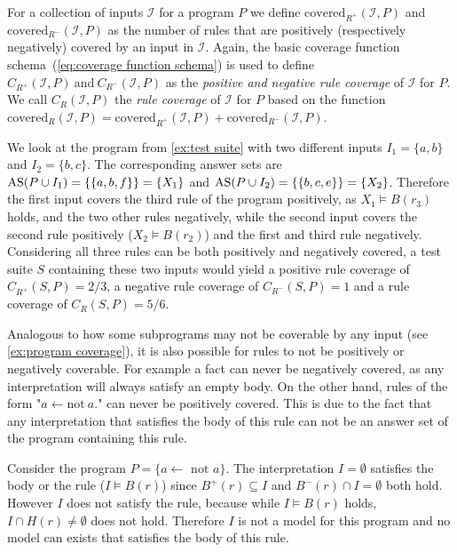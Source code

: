 For a collection of inputs $\mathcal{I}$ for a program $P$ we define \(\text{covered}_{R^+}(\mathcal{I}, P)\) and \linebreak \(\text{covered}_{R^-}(\mathcal{I}, P)\) as the number of rules that are positively (respectively negatively) covered by an input in $\mathcal{I}$. Again, the basic coverage function schema~(\ref{eq:coverage function schema}) is used to define \(C_{R^+}(\mathcal{I}, P)\ \text{and}\ C_{R^-}(\mathcal{I}, P)\) as the \emph{positive and negative rule coverage} of $\mathcal{I}$ for $P$. We call \(C_R(\mathcal{I}, P)\) the \emph{rule coverage} of $\mathcal{I}$ for $P$ based on the function \(\text{covered}_{R}(\mathcal{I}, P) = \text{covered}_{R^+}(\mathcal{I}, P) + \text{covered}_{R^-}(\mathcal{I}, P)\).

\begin{example}
\label{ex:rule coverage}
    We look at the program from \cref{ex:test suite} with two different inputs \(I_1 = \{a, b\}\) and \(I_2 = \{b, c\}\). The corresponding answer sets are \(\operatorname{AS}(P \cup I_1) = \{\{a, b, f\}\} = \{X_1\}\) and \(\operatorname{AS}(P \cup I_2) = \{\{b, c, e\}\} = \{X_2\}\). Therefore the first input covers the third rule of the program positively, as \(X_1 \models B(r_3)\) holds, and the two other rules negatively, while the second input covers the second rule positively (\(X_2 \models B(r_2)\)) and the first and third rule negatively. Considering all three rules can be both positively and negatively covered, a test suite $S$ containing these two inputs would yield a positive rule coverage of \(C_{R^+}(S, P) = 2/3\), a negative rule coverage of \(C_{R^-}(S, P) = 1\) and a rule coverage of \(C_R(S, P) = 5/6\).
\end{example}

Analogous to how some subprograms may not be coverable by any input (see \cref{ex:program coverage}), it is also possible for rules to not be positively or negatively coverable. For example a fact can never be negatively covered, as any interpretation will always satisfy an empty body. On the other hand, rules of the form "\(a \leftarrow \text{not}\ a.\)" can never be positively covered. This is due to the fact that any interpretation that satisfies the body of this rule can not be an answer set of the program containing this rule.

\begin{example}
\label{ex:special rules}
    Consider the program \(P = \{a \leftarrow \text{ not } a\}\).
    The interpretation \(I = \emptyset\) satisfies the body or the rule (\(I \models B(r)\)) since \(B^+(r) \subseteq I\) and \(B^-(r) \cap I = \emptyset\) both hold. However $I$ does not satisfy the rule, because while \(I \models B(r)\) holds, \(I \cap H(r) \neq \emptyset\) does not hold. Therefore $I$ is not a model for this program and no model can exists that satisfies the body of this rule.
\end{example}

